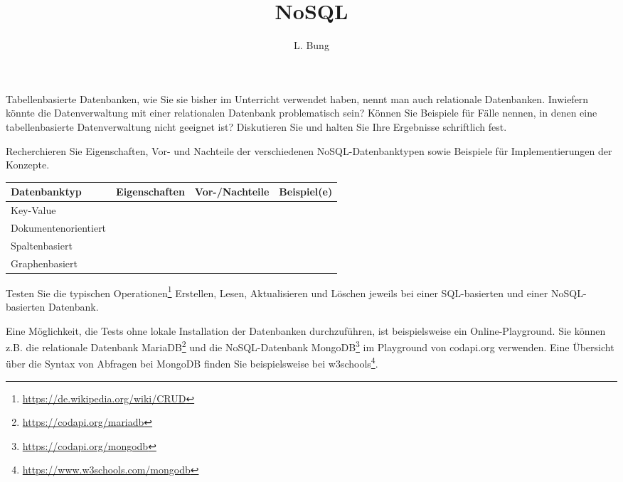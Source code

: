 \documentclass[11pt, a4paper, oneside]{article}
\begin{document}
	\author{L. Bung}
	\title{NoSQL}
	\subject{SAE}
	\maketitle
	
	
	Tabellenbasierte Datenbanken, wie Sie sie bisher im Unterricht verwendet haben, nennt man auch relationale Datenbanken.
	Inwiefern könnte die Datenverwaltung mit einer relationalen Datenbank problematisch sein?
	Können Sie Beispiele für Fälle nennen, in denen eine tabellenbasierte Datenverwaltung nicht geeignet ist?
	Diskutieren Sie und halten Sie Ihre Ergebnisse schriftlich fest.
	
	\boxarea[15cm]
	
	\pagebreak
	
	
	Recherchieren Sie Eigenschaften, Vor- und Nachteile der verschiedenen NoSQL-Datenbanktypen sowie Beispiele für Implementierungen der Konzepte.	
	
	\begin{table}[h]
		\renewcommand{\arraystretch}{2}
		\setlength\tabcolsep{.5cm}
		\begin{tabularx}{\textwidth}{|l|X|X|X|}
			\hline
			\textbf{Datenbanktyp} & \textbf{Eigenschaften}& \textbf{Vor-/Nachteile} & \textbf{Beispiel(e)}\\
			\hline
			Key-Value &&&\\[3.4cm]
			\hline
			Dokumentenorientiert &&&\\[3.4cm]
			\hline
			Spaltenbasiert &&&\\[3.4cm]
			\hline
			Graphenbasiert &&&\\[3.4cm]
			\hline
		\end{tabularx}
	\end{table}
	\pagebreak
	
	
	Testen Sie die typischen Operationen\footnote{\url{https://de.wikipedia.org/wiki/CRUD}} Erstellen, Lesen, Aktualisieren und Löschen jeweils bei einer SQL-basierten und einer NoSQL-basierten Datenbank.
	
	Eine Möglichkeit, die Tests ohne lokale Installation der Datenbanken durchzuführen, ist beispielsweise ein Online-Playground.
	Sie können z.B. die relationale Datenbank MariaDB\footnote{\url{https://codapi.org/mariadb}} und die NoSQL-Datenbank MongoDB\footnote{\url{https://codapi.org/mongodb}} im Playground von codapi.org verwenden.
	Eine Übersicht über die Syntax von Abfragen bei MongoDB finden Sie beispielsweise bei w3schools\footnote{\url{https://www.w3schools.com/mongodb}}.
	
\end{document}

